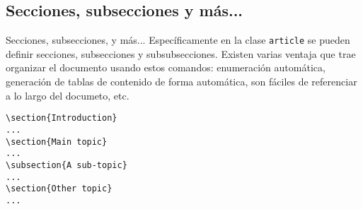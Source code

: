 \subsection{Secciones, subsecciones y más...}
\begin{frame}[fragile]{Secciones, subsecciones, y más...}
Específicamente en la clase \texttt{article} se pueden definir secciones,
subsecciones y subsubsecciones. Existen varias ventaja que trae organizar el
documento usando estos comandos: enumeración automática, generación de tablas
de contenido de forma automática, son fáciles de referenciar a lo largo del
documeto, etc.

\begin{lstlisting}[basicstyle=\tiny]
\section{Introduction}
...
\section{Main topic}
...
\subsection{A sub-topic}
...
\section{Other topic}
...
\end{lstlisting}

\end{frame}
